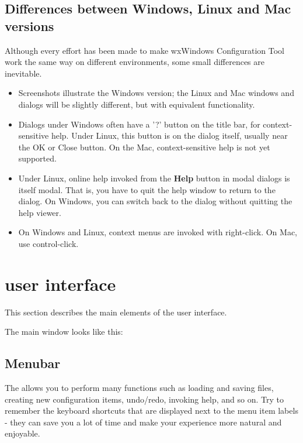 \section{Differences between Windows, Linux and Mac versions}\label{platformdifferences}

Although every effort has been made to make wxWindows Configuration Tool work
the same way on different environments, some small differences
are inevitable.

\begin{itemize}\itemsep=10pt
\item Screenshots illustrate the Windows version; the Linux
and Mac windows and dialogs will be slightly different, but with equivalent
functionality.
\item Dialogs under Windows often have a '?' button on the title
bar, for context-sensitive help. Under Linux, this button is
on the dialog itself, usually near the OK or Close button.
On the Mac, context-sensitive help is not yet supported.
\item Under Linux, online help invoked from the {\bf Help} button
in modal dialogs is itself modal. That is, you have to quit
the help window to return to the dialog. On Windows, you can
switch back to the dialog without quitting the help viewer.
\item On Windows and Linux, context menus are invoked with
right-click. On Mac, use control-click.
\end{itemize}

\chapter{\ctshortname user interface}\label{documentui}%
%
\setfooter{\thepage}{}{}{}{}{\thepage}%

This section describes the main elements of the \ctname user interface.

The \ctshortname main window looks like this:

\begin{center}
\end{center}

\section{Menubar}


The  allows you to perform many functions
such as loading and saving files, creating new configuration items,
undo/redo, invoking help, and so on. Try to remember the keyboard shortcuts that are
displayed next to the menu item labels - they can save you a lot of time
and make your \ctshortname experience more natural and enjoyable.

